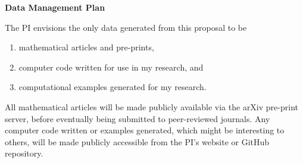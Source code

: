 \documentclass[12pt]{amsart}
\begin{document}
\begin{center}
\textbf{Data Management Plan}
\end{center}

\vspace{1cm}
The PI envisions the only data generated from this proposal to be 
\begin{enumerate}
	\item mathematical articles and pre-prints,
	\item computer code written for use in my research, and
	\item computational examples generated for my research.
\end{enumerate}
All mathematical articles will be made publicly available via the arXiv pre-print server, before eventually being submitted to peer-reviewed journals.  Any computer code written or examples generated, which might be interesting to others, will be made publicly accessible from the PI's website or GitHub repository. 

 \pagestyle{empty}
\end{document}

